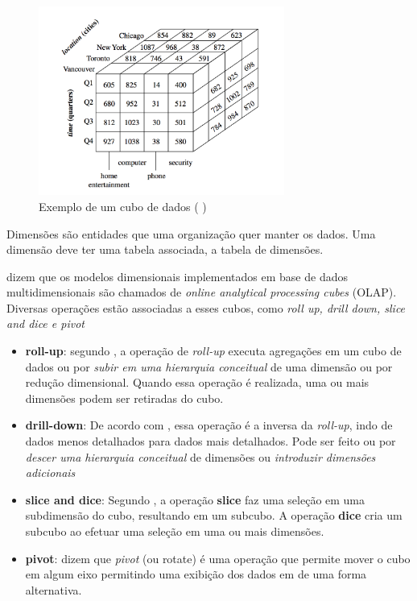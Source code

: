 \begin{figure}[ht]
\centering
\includegraphics[height=6.2cm]{imagens/datacube.png}
\caption{Exemplo de um cubo de dados (\citeauthor{jmj} \citeyear{jmj})}
\label{cube}
\end{figure}
Dimensões são entidades que uma organização quer manter os dados. Uma dimensão deve ter uma tabela associada, a tabela de dimensões.


 dizem que os modelos dimensionais implementados em base de dados multidimensionais são chamados de \textit{online analytical processing cubes} (OLAP). Diversas operações estão associadas a esses cubos, como \textit{roll up, drill down, slice and dice e pivot}

\begin{itemize}
    \item \textbf{roll-up}: segundo , a operação de \textit{roll-up} executa agregações em um cubo de dados ou por \textit{subir em uma hierarquia conceitual} de uma dimensão ou por redução dimensional. Quando essa operação é realizada, uma ou mais dimensões podem ser retiradas do cubo.
    
    \item \textbf{drill-down}: De acordo com  , essa operação é a inversa da \textit{roll-up}, indo de dados menos detalhados para dados mais detalhados. Pode ser feito ou por \textit{descer uma hierarquia conceitual} de dimensões ou \textit{introduzir dimensões adicionais}
    
    \item \textbf{slice and dice}: Segundo  , a operação \textbf{slice} faz uma seleção em uma subdimensão do cubo, resultando em um subcubo. A operação \textbf{dice} cria um subcubo ao efetuar uma seleção em uma ou mais dimensões.
    
    \item \textbf{pivot}:  dizem que \textit{pivot} (ou rotate) é uma operação que permite mover o cubo em algum eixo permitindo uma exibição dos dados em de uma forma alternativa.
\end{itemize}
